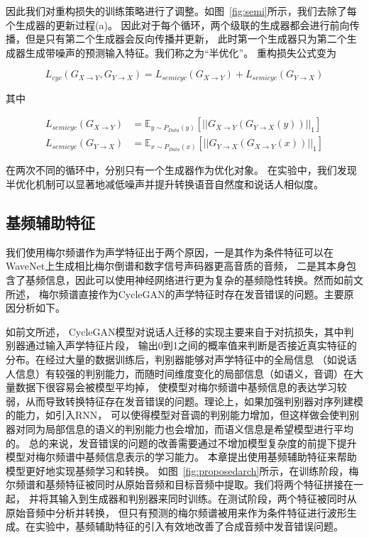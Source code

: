 因此我们对重构损失的训练策略进行了调整。如图~\ref{fig:semi}所示，我们去除了每个生成器的更新过程(a)。
因此对于每个循环，两个级联的生成器都会进行前向传播，但是只有第二个生成器会反向传播并更新，
此时第一个生成器只为第二个生成器生成带噪声的预测输入特征。我们称之为“半优化”。
重构损失公式变为

\begin{equation}
    L_{cyc}(G_{X\rightarrow Y},G_{Y\rightarrow X}) = L_{semicyc}(G_{X\rightarrow Y}) + L_{semicyc}(G_{Y\rightarrow X})
\end{equation}

其中

\begin{align}
    L_{semicyc}(G_{X\rightarrow Y}) & = \mathbb{E}_{y\sim P_{Data}(y)}\left[ \left| \left| G_{X\rightarrow Y}(G_{Y\rightarrow X}(y)) \right| \right|_1 \right] \\
    L_{semicyc}(G_{Y\rightarrow X}) & = \mathbb{E}_{x\sim P_{Data}(x)}\left[ \left| \left| G_{Y\rightarrow X}(G_{X\rightarrow Y}(x)) \right| \right|_1 \right]
\end{align}

在两次不同的循环中，分别只有一个生成器作为优化对象。
在实验中，我们发现半优化机制可以显著地减低噪声并提升转换语音自然度和说话人相似度。

\subsection{基频辅助特征}

我们使用梅尔频谱作为声学特征出于两个原因，一是其作为条件特征可以在WaveNet上生成相比梅尔倒谱和数字信号声码器更高音质的音频，
二是其本身包含了基频信息，因此可以使用神经网络进行更为复杂的基频隐性转换。然而如前文所述，
梅尔频谱直接作为CycleGAN的声学特征时存在发音错误的问题。主要原因分析如下。

如前文所述，
CycleGAN模型对说话人迁移的实现主要来自于对抗损失，其中判别器通过输入声学特征片段，
输出0到1之间的概率值来判断是否接近真实特征的分布。在经过大量的数据训练后，判别器能够对声学特征中的全局信息
（如说话人信息）有较强的判别能力，而随时间维度变化的局部信息（如语义，音调）在大量数据下很容易会被模型平均掉，
使模型对梅尔频谱中基频信息的表达学习较弱，从而导致转换特征存在发音错误的问题。理论上，如果加强判别器对序列建模的能力，如引入RNN，
可以使得模型对音调的判别能力增加，但这样做会使判别器对同为局部信息的语义的判别能力也会增加，而语义信息是希望模型进行平均的。
总的来说，发音错误的问题的改善需要通过不增加模型复杂度的前提下提升模型对梅尔频谱中基频信息表示的学习能力。
本章提出使用基频辅助特征来帮助模型更好地实现基频学习和转换。
如图~\ref{fig:proposedarch}所示，在训练阶段，梅尔频谱和基频特征被同时从原始音频和目标音频中提取。我们将两个特征拼接在一起，
并将其输入到生成器和判别器来同时训练。在测试阶段，两个特征被同时从原始音频中分析并转换，
但只有预测的梅尔频谱被用来作为条件特征进行波形生成。在实验中，基频辅助特征的引入有效地改善了合成音频中发音错误问题。

